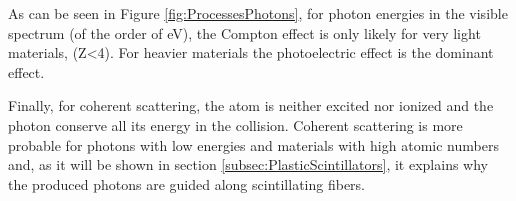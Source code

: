 As can be seen in Figure \ref{fig:ProcessesPhotons}, for photon energies in the visible spectrum (of the order of eV), the Compton effect is only likely for very light materials, (Z<4). For heavier materials the photoelectric effect is the dominant effect.

Finally, for coherent scattering, the atom is neither excited nor ionized and the photon conserve all its energy in the collision. Coherent scattering is more probable for photons with low energies and materials with high atomic numbers and, as it will be shown in section \ref{subsec:PlasticScintillators}, it explains why the produced photons are guided along scintillating fibers. 


